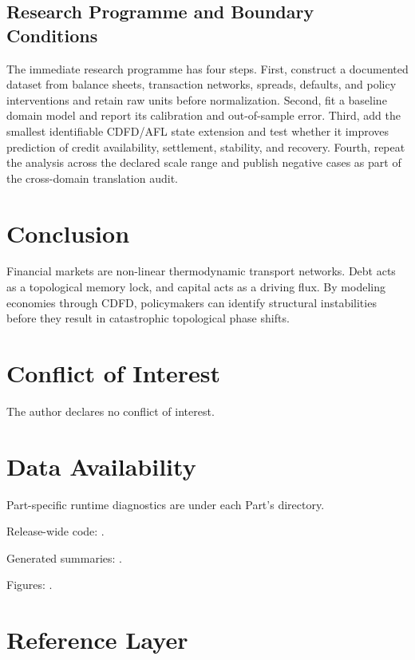 \documentclass[11pt,a4paper]{article}
\begin{document}
\subsection{Research Programme and Boundary Conditions}

The immediate research programme has four steps. First, construct a documented
dataset from balance sheets, transaction networks, spreads, defaults, and policy interventions and retain raw units before normalization.
Second, fit a baseline domain model and report its calibration and out-of-sample
error. Third, add the smallest identifiable CDFD/AFL state extension and test
whether it improves prediction of credit availability, settlement, stability, and recovery. Fourth, repeat the
analysis across the declared scale range and publish negative cases as part of
the cross-domain translation audit.


\section{Conclusion}
Financial markets are non-linear thermodynamic transport networks. Debt acts as a topological memory lock, and capital acts as a driving flux. By modeling economies through CDFD, policymakers can identify structural instabilities before they result in catastrophic topological phase shifts.
\section*{Conflict of Interest} The author declares no conflict of interest.
\section*{Data Availability}
Part-specific runtime diagnostics are under each Part's  directory.

Release-wide code: .

Generated summaries: .

Figures: .


\section{Reference Layer}


\end{document}
